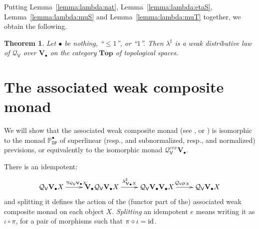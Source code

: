 \documentclass[preprint,12pt]{elsarticle}
\newcommand\identity[1]{\mathrm{id}_{#1}}
\newcommand\Pred{\mathbb{P}}
\newcommand\Demon{{\mathtt{D}}}
\newcommand\Nature{{\mathtt{P}}}
\newcommand\DN{{\Demon\Nature}}
\newcommand\Smyth{{\mathcal Q}}
\newcommand\Vt{\mathsf{V}}
\newcommand\SV{\Smyth_{\Vt}}
\newcommand\Val{{\mathbf V}}
\newcommand\Topcat{\mathbf{Top}}
\newtheorem{theorem}{Theorem}[section]
\begin{document}
Putting Lemma~\ref{lemma:lambda:nat}, Lemma~\ref{lemma:lambda:etaS},
Lemma~\ref{lemma:lambda:muS} and Lemma~\ref{lemma:lambda:muT}
together, we obtain the following.
\begin{theorem}
  \label{thm:lambda}
  Let $\bullet$ be nothing, ``$\leq 1$'', or ``$1$''.  Then
  $\lambda^\sharp$ is a weak distributive law of $\SV$ over
  $\Val_\bullet$ on the category $\Topcat$ of topological spaces.
\end{theorem}

\section{The associated weak composite monad}
\label{sec:associated-monad}


We will show that the associated weak composite monad (see
\cite[Section~3.2]{Garner:weak:distr}, or \cite[page~46]{Goy:PhD}) is
isomorphic to the monad $\Pred_\DN^\bullet$ of superlinear (resp., and
subnormalized, resp., and normalized) previsions, or equivalently to
the isomorphic monad $\SV^{cvx} \Val_\bullet$.

There is an idempotent:
\begin{equation}
  \label{eq:idemp}
  \xymatrix{
    \SV {\Val_\bullet X} \ar[r]^{\eta_{\SV {\Val_\bullet X}}}
    & \Val_\bullet {\SV {\Val_\bullet X}}
    \ar[r]^{\lambda^\sharp_{\Val_\bullet X}}
    & \SV {\Val_\bullet {\Val_\bullet X}}
    \ar[r]^{\SV {\mu_X}}
    & \SV {\Val_\bullet X}
  }
\end{equation}
and splitting it defines the action of the (functor part of the)
associated weak composite monad on each object $X$.  \emph{Splitting}
an idempotent $e$ means writing it as $\iota \circ \pi$, for a pair of
morphisms such that $\pi \circ \iota = \identity \relax$.
\end{document}
